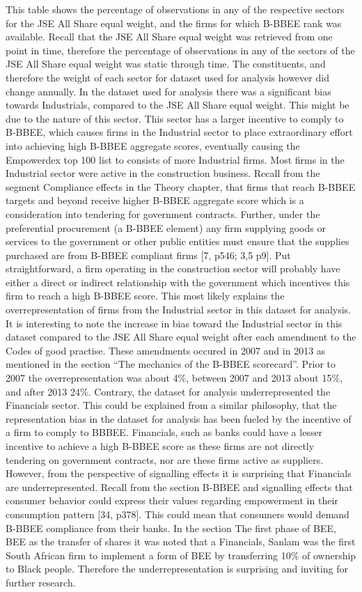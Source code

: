 This table shows the percentage of observations in any of the respective sectors for the JSE All Share equal weight, and the firms for which B-BBEE rank was available. Recall that the JSE All Share equal weight was retrieved from one point in time, therefore the percentage of observations in any of the sectors of the JSE All Share equal weight was static through time. The constituents, and therefore the weight of each sector for dataset used for analysis however did change annually. In the dataset used for analysis there was a significant bias towards Industrials, compared to the JSE All Share equal weight. This might be due to the nature of this sector. This sector has a larger incentive  to comply to B-BBEE, which causes firms in the Industrial sector to place extraordinary effort into achieving high B-BBEE aggregate scores, eventually causing the Empowerdex top 100 list to consists of more Industrial firms. Most firms in the Industrial sector were active in the construction business. Recall from the segment Compliance effects in the Theory chapter, that firms that reach B-BBEE targets and beyond receive higher B-BBEE aggregate score which is a consideration into tendering for government contracts. Further, under the preferential procurement (a B-BBEE element) any firm supplying goods or services to the government or other public entities must ensure that the supplies purchased are from B-BBEE compliant firms [7, p546; 3,5 p9]. Put straightforward, a firm operating in the construction sector will probably have either a direct or indirect relationship with the government which incentives this firm to reach a high B-BBEE score. This most likely explains the overrepresentation of firms from the Industrial sector in this dataset for analysis. It is interesting to note the increase in bias toward the Industrial sector in this dataset compared to the JSE All Share equal weight after each amendment to the Codes of good practise. These amendments occured in 2007 and in 2013 as mentioned in the section “The mechanics of the B-BBEE scorecard”. Prior to 2007 the overrepresentation was about 4\%, between 2007 and 2013 about 15\%, and after 2013 24\%. Contrary, the dataset for analysis underrepresented the Financials sector. This could be explained from a similar philosophy, that the representation bias in the dataset for analysis has been fueled by the incentive of a firm to comply to BBBEE. Financials, such as banks could have a lesser incentive to achieve a high B-BBEE score as these firms are not directly tendering on government contracts, nor are these firms active as suppliers. However, from the perspective of signalling effects it is surprising that Financials are underrepresented. Recall from the section B-BBEE and signalling effects that consumer behavior could express their values regarding empowerment in their consumption pattern [34, p378]. This could mean that consumers would demand B-BBEE compliance from their banks. In the section The first phase of BEE, BEE as the transfer of shares it was noted that a Financials, Sanlam was the first South African firm to implement a form of BEE by transferring 10\% of ownership to Black people. Therefore the underrepresentation is surprising and inviting for further research.

